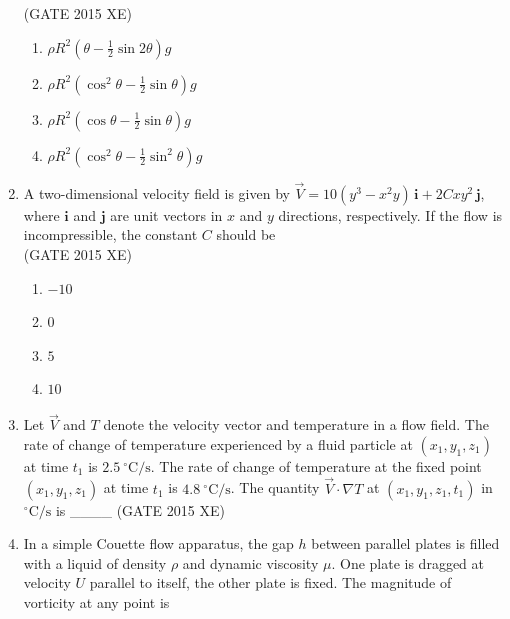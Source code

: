 \documentclass[journal,12pt,onecolumn]{IEEEtran}
\begin{document}
\begin{enumerate}
\hfill{(GATE 2015 XE)} \\

\begin{multicols}{2}
\begin{enumerate}
\item $\rho R^2 \left(\theta - \frac{1}{2} \sin 2\theta \right) g$
\item $\rho R^2 \left(\cos^2 \theta - \frac12 \sin \theta \right) g$
\item $\rho R^2 \left(\cos \theta - \frac12 \sin \theta \right) g$
\item $\rho R^2 \left(\cos^2 \theta - \frac12 \sin^2 \theta \right) g$
\end{enumerate}
\end{multicols}


\item A two-dimensional velocity field is given by  
$\vec{V} = 10(y^3 - x^2 y) \, \mathbf{i} + 2C x y^2 \, \mathbf{j}$, where $\mathbf{i}$ and $\mathbf{j}$ are unit vectors in $x$ and $y$ directions, respectively. If the flow is incompressible, the constant $C$ should be \\

\hfill{(GATE 2015 XE)} 
\begin{multicols}{4}
\begin{enumerate}
\item $-10$
\item $0$
\item $5$
\item $10$
\end{enumerate}
\end{multicols}

\newpage 

\item Let $\vec{V}$ and $T$ denote the velocity vector and temperature in a flow field. The rate of change of temperature experienced by a fluid particle at $(x_1, y_1, z_1)$ at time $t_1$ is $2.5 \ ^\circ\mathrm{C/s}$. The rate of change of temperature at the fixed point $(x_1, y_1, z_1)$ at time $t_1$ is $4.8 \ ^\circ\mathrm{C/s}$. The quantity $\vec{V} \cdot \nabla T$ at $(x_1, y_1, z_1, t_1)$ in $^\circ\mathrm{C/s}$ is \_\_\_\_
\hfill{(GATE 2015 XE)} \\



\item In a simple Couette flow apparatus, the gap $h$ between parallel plates is filled with a liquid of density $\rho$ and dynamic viscosity $\mu$. One plate is dragged at velocity $U$ parallel to itself, the other plate is fixed. The magnitude of vorticity at any point is  \\


\end{enumerate}
\end{document}
